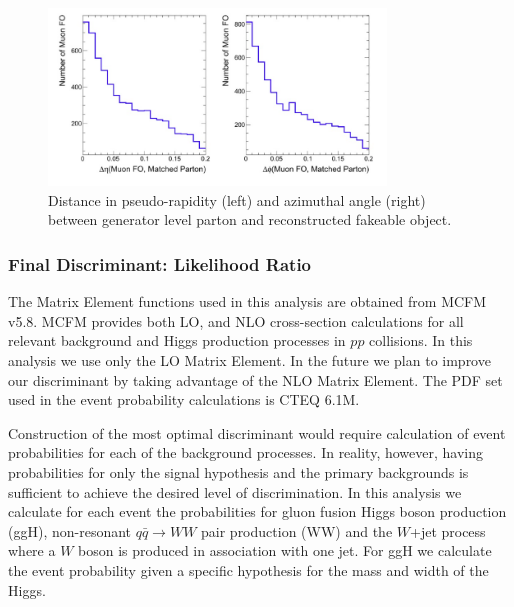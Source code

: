 \begin{figure}[!htbp]                                                                                         
\begin{center}                                                                                                
\includegraphics[width=0.8\textwidth]{figures/PartonLeptonDIrection.png}                                            
\caption{Distance in pseudo-rapidity (left) and azimuthal angle (right)
between generator level parton and reconstructed fakeable object.}                                                                                 
\label{fig:partonleptondirection}                                                                                          
\end{center}                                                                                                  
\end{figure}   


\clearpage
\subsubsection{Final Discriminant: Likelihood Ratio}
\label{sec:LR}
The Matrix Element functions used in this analysis are obtained from MCFM v5.8.  
MCFM provides both LO, and NLO cross-section calculations for 
all relevant background and Higgs production processes in $pp$ collisions. In this analysis 
we use only the LO Matrix Element. In the future we plan to improve our discriminant 
by taking advantage of the NLO Matrix Element. The PDF set used in the event probability 
calculations is CTEQ 6.1M.

Construction of the most optimal discriminant would require calculation 
of event probabilities for each of the background processes. In reality, however, having 
probabilities for only the signal hypothesis and the primary backgrounds is sufficient to achieve 
the desired level of discrimination. In this analysis we calculate for each event the probabilities 
for gluon fusion Higgs boson production (ggH), non-resonant $q\bar{q}\rightarrow WW$ pair 
production (WW) and the $W$+jet process where a $W$ boson is produced in association
with one jet.   For ggH we calculate the event probability given a specific hypothesis for the
mass and width of the Higgs.

